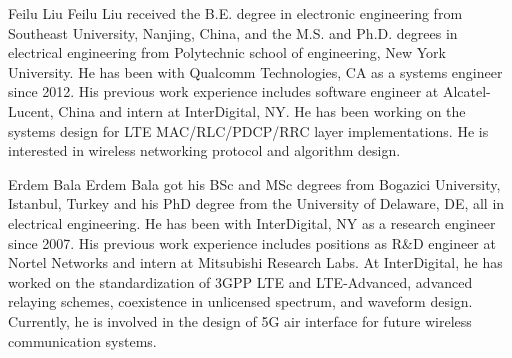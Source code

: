 \documentclass[journal,final,letterpaper,10pt,doublecolumn,twoside]{IEEEtran}
\begin{document}
\begin{IEEEbiography}{Feilu Liu}
Feilu Liu received the B.E. degree in electronic engineering from Southeast University, Nanjing, China, and the M.S. and Ph.D. degrees in electrical engineering from Polytechnic school of engineering, New York University. He has been with Qualcomm Technologies, CA as a systems engineer since 2012. His previous work experience includes software engineer at Alcatel-Lucent, China and intern at InterDigital, NY. He has been working on the systems design for LTE MAC/RLC/PDCP/RRC layer implementations. He is interested in wireless networking protocol and algorithm design.
\end{IEEEbiography}


\begin{IEEEbiography}{Erdem Bala}
Erdem Bala got his BSc and MSc degrees from Bogazici University, Istanbul, Turkey and his PhD degree from the University of Delaware, DE, all in electrical engineering. He has been with InterDigital, NY as a research engineer since 2007. His previous work experience includes positions as R\&D engineer at Nortel Networks and intern at Mitsubishi Research Labs. At InterDigital, he has worked on the standardization of 3GPP LTE and LTE-Advanced, advanced relaying schemes, coexistence in unlicensed spectrum, and waveform design. Currently, he is involved in the design of 5G air interface for future wireless communication systems.
\end{IEEEbiography}
\end{document}
